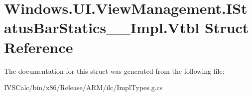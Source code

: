 \hypertarget{struct_windows_1_1_u_i_1_1_view_management_1_1_i_status_bar_statics_____impl_1_1_vtbl}{}\section{Windows.\+U\+I.\+View\+Management.\+I\+Status\+Bar\+Statics\+\_\+\+\_\+\+Impl.\+Vtbl Struct Reference}
\label{struct_windows_1_1_u_i_1_1_view_management_1_1_i_status_bar_statics_____impl_1_1_vtbl}


The documentation for this struct was generated from the following file\+:\begin{DoxyCompactItemize}
\item 
I\+V\+S\+Calc/bin/x86/\+Release/\+A\+R\+M/ilc/Impl\+Types.\+g.\+cs\end{DoxyCompactItemize}
